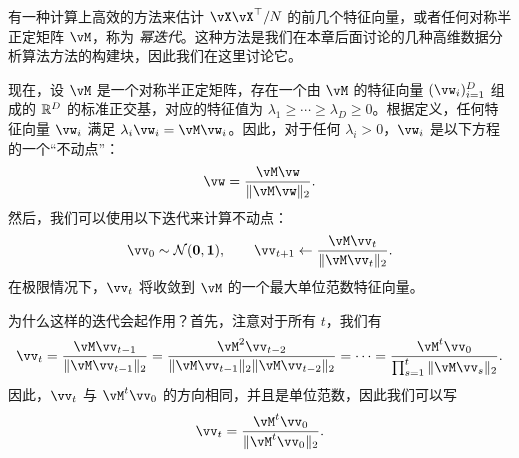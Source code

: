 \documentclass[../../book-main.tex]{subfiles}
\begin{document}
有一种计算上高效的方法来估计 \(\vX\vX^{\top}/N\) 的前几个特征向量，或者任何对称半正定矩阵 \(\vM\)，称为 \textit{幂迭代}。这种方法是我们在本章后面讨论的几种高维数据分析算法方法的构建块，因此我们在这里讨论它。

现在，设 \(\vM\) 是一个对称半正定矩阵，存在一个由 \(\vM\) 的特征向量 \((\vw_{i})_{i = 1}^{D}\) 组成的 \(\mathbb{R}^{D}\) 的标准正交基，对应的特征值为 \(\lambda_{1} \geq \cdots \geq \lambda_{D} \geq 0\)。根据定义，任何特征向量 \(\vw_i\) 满足 \(\lambda_i \vw_i = \vM \vw_i\)。因此，对于任何 \(\lambda_i > 0\)，\(\vw_i\) 是以下方程的一个“不动点”：
\begin{equation}
    \vw = \frac{\vM\vw}{\norm{\vM\vw}_{2}}.
    \label{eqn:PCA-fixed-point}
\end{equation}
然后，我们可以使用以下迭代来计算不动点：
\begin{equation}\label{eq:power_iteration}
    \vv_{0} \sim \dNorm(\vzero, \vone), \qquad \vv_{t + 1} \gets \frac{\vM\vv_{t}}{\norm{\vM\vv_{t}}_{2}}.
\end{equation}
在极限情况下，\(\vv_{t}\) 将收敛到 \(\vM\) 的一个最大单位范数特征向量。

为什么这样的迭代会起作用？首先，注意对于所有 \(t\)，我们有
\begin{equation}
    \vv_{t} = \frac{\vM\vv_{t - 1}}{\norm{\vM\vv_{t - 1}}_{2}} = \frac{\vM^{2}\vv_{t - 2}}{\norm{\vM\vv_{t - 1}}_{2}\norm{\vM\vv_{t - 2}}_{2}} = \cdots = \frac{\vM^{t}\vv_{0}}{\prod_{s = 1}^{t}\norm{\vM\vv_{s}}_{2}}.
\end{equation}
因此，\(\vv_{t}\) 与 \(\vM^{t}\vv_{0}\) 的方向相同，并且是单位范数，因此我们可以写
\begin{equation}
    \vv_{t} = \frac{\vM^{t}\vv_{0}}{\norm{\vM^{t}\vv_{0}}_{2}}.
\end{equation}
\end{document}
